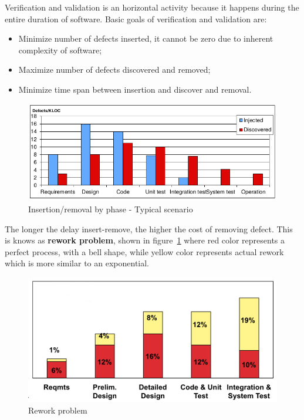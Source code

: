Verification and validation is an horizontal activity because it happens during the entire duration of software. Basic goals of verification and validation are:
\begin{itemize}
\item Minimize number of defects inserted, it cannot be zero due to inherent complexity of software;
\item Maximize number of defects discovered and removed;
\item Minimize time span between insertion and discover and removal.
\end{itemize}

\begin{figure}[hbtp]
\centering
\includegraphics[scale=0.4]{images/defects_insertion_removal.png}
\caption{Insertion/removal by phase - Typical scenario}
\end{figure}

The longer the delay insert-remove, the higher the cost of removing defect. This is knows as \textbf{rework problem}, shown in figure~\ref{img:rework_problem} where red color represents a perfect process, with a bell shape, while yellow color represents actual rework which is more similar to an exponential.

\begin{figure}[hbtp]
\centering
\includegraphics[scale=0.35]{images/rework_problem.png}
\caption{Rework problem}
\label{img:rework_problem}
\end{figure}

